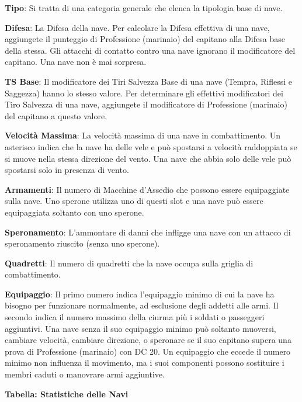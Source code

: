 \documentclass[a4paper,twoside,openany]{book}
\begin{document}
\begin{multicols}{2}
\textbf{Tipo}: Si tratta di una categoria generale che elenca la tipologia base di nave.

\textbf{Difesa}: La Difesa della nave. Per calcolare la Difesa effettiva di una nave, aggiungete il punteggio di Professione (marinaio) del capitano alla Difesa base della stessa. Gli attacchi di contatto contro una nave ignorano il modificatore del capitano. Una nave non è mai sorpresa.

\textbf{TS Base}: Il modificatore dei Tiri Salvezza Base di una nave (Tempra, Riflessi e Saggezza) hanno lo stesso valore. Per determinare gli effettivi modificatori dei Tiro Salvezza di una nave, aggiungete il modificatore di Professione (marinaio) del capitano a questo valore.

\textbf{Velocità Massima}: La velocità massima di una nave in combattimento. Un asterisco indica che la nave ha delle vele e può spostarsi a velocità raddoppiata se si muove nella stessa direzione del vento. Una nave che abbia solo delle vele può spostarsi solo in presenza di vento.

\textbf{Armamenti}: Il numero di Macchine d'Assedio che possono essere equipaggiate sulla nave. Uno sperone utilizza uno di questi slot e una nave può essere equipaggiata soltanto con uno sperone.

\textbf{Speronamento}: L'ammontare di danni che infligge una nave con un attacco di speronamento riuscito (senza uno sperone).

\textbf{Quadretti}: Il numero di quadretti che la nave occupa sulla griglia di combattimento.

\textbf{Equipaggio}: Il primo numero indica l'equipaggio minimo di cui la nave ha bisogno per funzionare normalmente, ad esclusione degli addetti alle armi. Il secondo indica il numero massimo della ciurma più i soldati o passeggeri aggiuntivi. Una nave senza il suo equipaggio minimo può soltanto muoversi, cambiare velocità, cambiare direzione, o speronare se il suo capitano supera una prova di Professione (marinaio) con DC 20.
Un equipaggio che eccede il numero minimo non influenza il movimento, ma i suoi componenti possono sostituire i membri caduti o manovrare armi aggiuntive.

\bigskip

\end{multicols}

\textbf{Tabella: Statistiche delle Navi}

\medskip
\end{document}
